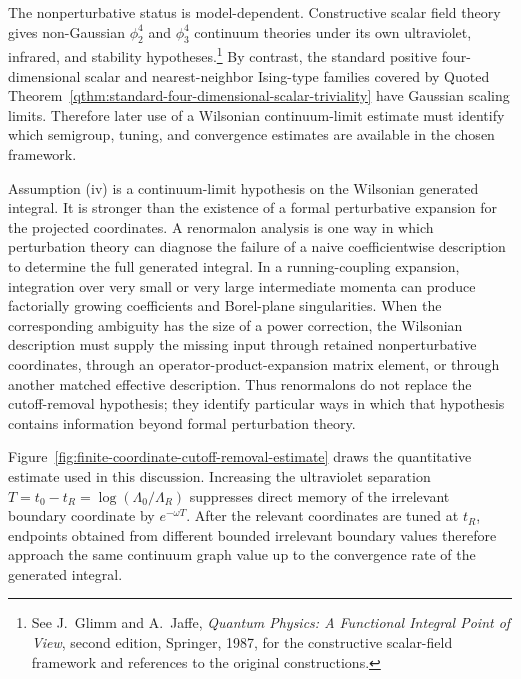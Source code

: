\begin{remark}
The nonperturbative status is model-dependent.  Constructive scalar field
theory gives non-Gaussian \(\phi^4_2\) and \(\phi^4_3\) continuum theories
under its own ultraviolet, infrared, and stability hypotheses.\footnote{See
J.~Glimm and A.~Jaffe, \emph{Quantum Physics: A Functional Integral Point of
View}, second edition, Springer, 1987, for the constructive scalar-field
framework and references to the original constructions.}  By contrast, the
standard positive four-dimensional scalar and nearest-neighbor Ising-type
families covered by
Quoted Theorem~\ref{qthm:standard-four-dimensional-scalar-triviality} have Gaussian
scaling limits.  Therefore later use of a Wilsonian continuum-limit estimate
must identify which semigroup, tuning, and convergence estimates are
available in the chosen framework.
\end{remark}

\begin{remark}
Assumption (iv) is a continuum-limit hypothesis on the Wilsonian generated
integral.  It is stronger than the existence of a formal perturbative expansion
for the projected coordinates.  A renormalon analysis is one way in which
perturbation theory can diagnose the failure of a naive coefficientwise
description to determine the full generated integral.  In a running-coupling
expansion, integration over very small or very large intermediate momenta can
produce factorially growing coefficients and Borel-plane singularities.  When
the corresponding ambiguity has the size of a power correction, the Wilsonian
description must supply the missing input through retained nonperturbative
coordinates, through an operator-product-expansion matrix element, or through
another matched effective description.  Thus renormalons do not replace the
cutoff-removal hypothesis; they identify particular ways in which that
hypothesis contains information beyond formal perturbation theory.
\end{remark}

Figure~\ref{fig:finite-coordinate-cutoff-removal-estimate} draws the
quantitative estimate used in this discussion.  Increasing the ultraviolet
separation \(T=t_0-t_R=\log(\Lambda_0/\Lambda_R)\) suppresses direct memory of
the irrelevant boundary coordinate by \(e^{-\omega T}\).  After the relevant
coordinates are tuned at \(t_R\), endpoints obtained from different bounded
irrelevant boundary values therefore approach the same continuum graph value
up to the convergence rate of the generated integral.

